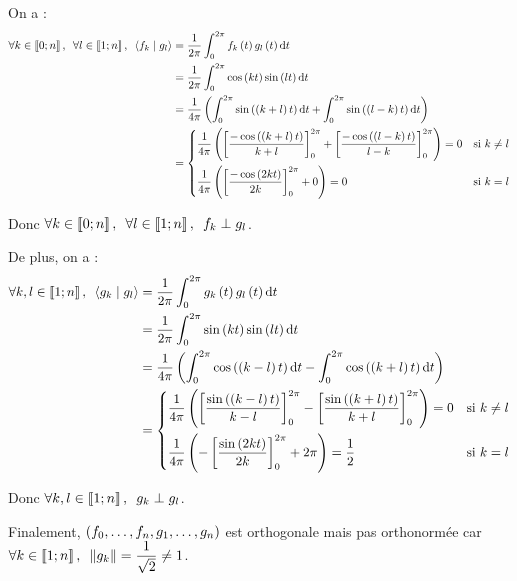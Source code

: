 \begin{corr}[3]
On a : \[\begin{aligned}
\quantifs{\forall k\in\interventierii{0}{n};\forall l\in\interventierii{1}{n}}\ps{f_k}{g_l}&=\dfrac{1}{2\pi}\int_0^{2\pi}f_k\paren{t}g_l\paren{t}\odif{t} \\
&=\dfrac{1}{2\pi}\int_0^{2\pi}\cos\paren{kt}\sin\paren{lt}\odif{t} \\
&=\dfrac{1}{4\pi}\paren{\int_0^{2\pi}\sin\paren{\paren{k+l}t}\odif{t}+\int_0^{2\pi}\sin\paren{\paren{l-k}t}\odif{t}} \\
&=\begin{dcases}
\dfrac{1}{4\pi}\paren{\croch{\dfrac{-\cos\paren{\paren{k+l}t}}{k+l}}_0^{2\pi}+\croch{\dfrac{-\cos\paren{\paren{l-k}t}}{l-k}}_0^{2\pi}}=0 &\text{si }k\not=l \\
\dfrac{1}{4\pi}\paren{\croch{\dfrac{-\cos\paren{2kt}}{2k}}_0^{2\pi}+0}=0 &\text{si }k=l
\end{dcases}
\end{aligned}\]

Donc \(\quantifs{\forall k\in\interventierii{0}{n};\forall l\in\interventierii{1}{n}}f_k\perp g_l\).

De plus, on a : \[\begin{aligned}
\quantifs{\forall k,l\in\interventierii{1}{n}}\ps{g_k}{g_l}&=\dfrac{1}{2\pi}\int_0^{2\pi}g_k\paren{t}g_l\paren{t}\odif{t} \\
&=\dfrac{1}{2\pi}\int_0^{2\pi}\sin\paren{kt}\sin\paren{lt}\odif{t} \\
&=\dfrac{1}{4\pi}\paren{\int_0^{2\pi}\cos\paren{\paren{k-l}t}\odif{t}-\int_0^{2\pi}\cos\paren{\paren{k+l}t}\odif{t}} \\
&=\begin{dcases}
\dfrac{1}{4\pi}\paren{\croch{\dfrac{\sin\paren{\paren{k-l}t}}{k-l}}_0^{2\pi}-\croch{\dfrac{\sin\paren{\paren{k+l}t}}{k+l}}_0^{2\pi}}=0 &\text{si }k\not=l \\
\dfrac{1}{4\pi}\paren{-\croch{\dfrac{\sin\paren{2kt}}{2k}}_0^{2\pi}+2\pi}=\dfrac{1}{2} &\text{si }k=l
\end{dcases}
\end{aligned}\]

Donc \(\quantifs{\forall k,l\in\interventierii{1}{n}}g_k\perp g_l\).

Finalement, \(\left(f_0,\dots,f_n,g_1,\dots,g_n\right)\) est orthogonale mais pas orthonormée car \(\quantifs{\forall k\in\interventierii{1}{n}}\norme{g_k}=\dfrac{1}{\sqrt{2}}\not=1\).
\end{corr}

